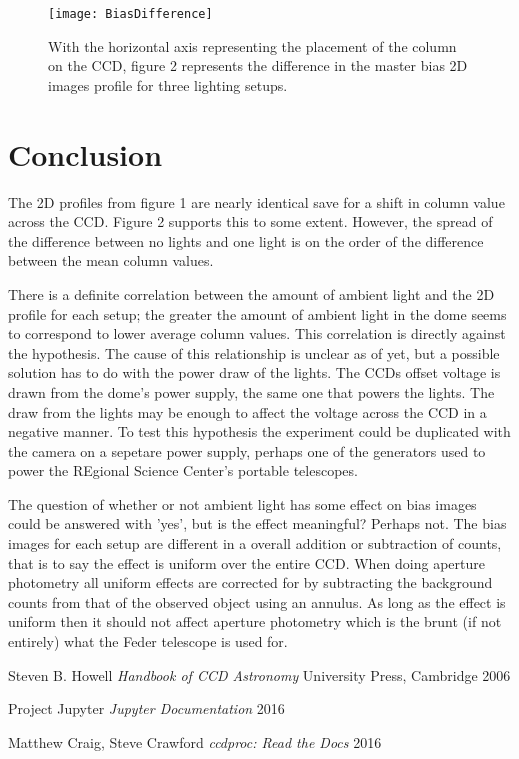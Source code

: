 \documentclass{article}
\begin{document}
\begin{figure}[h]
	\centering
		\texttt{[image: BiasDifference]}
	\caption{With the horizontal axis representing the placement of the column on the CCD, figure 2 represents the difference in the master bias 2D images profile for three lighting setups.}
\end{figure}


\section{Conclusion}
The 2D profiles from figure 1 are nearly identical save for a shift in column value across the CCD. Figure 2 supports this to some extent. However, the spread of the difference between no lights and one light is on the order of the difference between the mean column values. 

There is a definite correlation between the amount of ambient light and the 2D profile for each setup; the greater the amount of ambient light in the dome seems to correspond to lower average column values. This correlation is directly against the hypothesis. The cause of this relationship is unclear as of yet, but a possible solution has to do with the power draw of the lights. The CCDs offset voltage is drawn from the dome's power supply, the same one that powers the lights. The draw from the lights may be enough to affect the voltage across the CCD in a negative manner. To test this hypothesis the experiment could be duplicated with the camera on a sepetare power supply, perhaps one of the generators used to power the REgional Science Center's portable telescopes.

The question of whether or not ambient light has some effect on bias images could be answered with 'yes', but is the effect meaningful? Perhaps not. The bias images for each setup are different in a overall addition or subtraction of counts, that is to say the effect is uniform over the entire CCD. When doing aperture photometry all uniform effects are corrected for by subtracting the background counts from that of the observed object using an annulus. As long as the effect is uniform then it should not affect aperture photometry which is the brunt (if not entirely) what the Feder telescope is used for.

\begin{thebibliography}{9}

	Steven B. Howell
	\emph{Handbook of CCD Astronomy}
	University Press, Cambridge
	2006

	Project Jupyter
	\emph{Jupyter Documentation}
	2016

	Matthew Craig, Steve Crawford
	\emph{ccdproc: Read the Docs}
	2016

\end{thebibliography}
\end{document}
